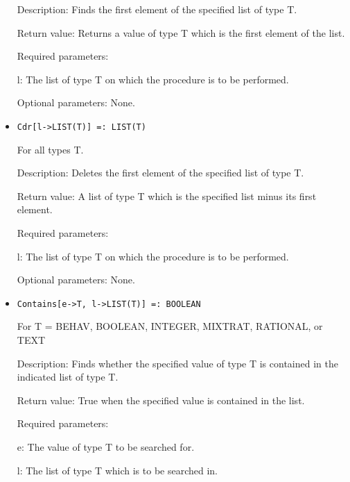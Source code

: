 \begin{itemize}
\bd
\item
[Description:] Finds the first element of the specified list of type
T.
\item
[Return value:] Returns a value of type T which is the first element
of the list.
\item 
[Required parameters:]\hfil\null
	
\bd
\item
[l:] The list of type T on which the procedure is to be performed.
\ed

\item
[Optional parameters:] None.
\ed

\item

\protect \large \begin{verbatim}
Cdr[l->LIST(T)] =: LIST(T)
\end{verbatim}\normalsize

For all types T.

\bd
\item
[Description:] Deletes the first element of the specified list of type
T.
\item 
[Return value:] A list of type T which is the specified list minus its
first element.
\item   
[Required parameters:]\hfil\null

\bd
\item
[l:] The list of type T on which the procedure is to be performed.
\ed
\item
[Optional parameters:] None.
\ed

\item
\protect \large \begin{verbatim}
Contains[e->T, l->LIST(T)] =: BOOLEAN
\end{verbatim}\normalsize

For T = BEHAV, BOOLEAN, INTEGER, MIXTRAT, RATIONAL, or TEXT

\bd
\item
[Description:] Finds whether the specified value of type T is
contained in the indicated list of type T.
\item 
[Return value:] True when the specified value is contained in the
list.
\item
[Required parameters:]\hfil\null
	
\bd
\item	
[e:] The value of type T to be searched for.
\item
[l:] The list of type T which is to be searched in.
\ed


\end{itemize}
